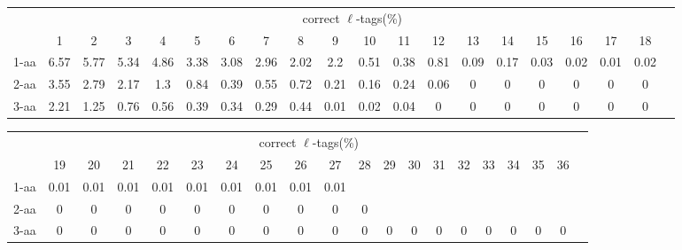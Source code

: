 \documentclass{article}[12pt]
\begin{document}
\begin{landscape}

\begin{table}[h]\tiny
\vspace{3mm}
{\centering
\begin{center}
\begin{tabular}{|l|c|c|c|c|c|c|c|c|c|c|c|c|c|c|c|c|c|c|c|}
  \hline
  & \multicolumn{ 18 }{|c|}{correct $\ell$-tags(\%)} \\
  \cline{2- 19}
    & 1 & 2 & 3 & 4 & 5 & 6 & 7 & 8 & 9 & 10 & 11 & 12 & 13 & 14 & 15 & 16 & 17 & 18\\
  \hline
1-aa  & 6.57 & 5.77 & 5.34 & 4.86 & 3.38 & 3.08 & 2.96 & 2.02 & 2.2 & 0.51 & 0.38 & 0.81 & 0.09 & 0.17 & 0.03 & 0.02 & 0.01 & 0.02\\
2-aa  & 3.55 & 2.79 & 2.17 & 1.3 & 0.84 & 0.39 & 0.55 & 0.72 & 0.21 & 0.16 & 0.24 & 0.06 & 0 & 0 & 0 & 0 & 0 & 0\\
3-aa  & 2.21 & 1.25 & 0.76 & 0.56 & 0.39 & 0.34 & 0.29 & 0.44 & 0.01 & 0.02 & 0.04 & 0 & 0 & 0 & 0 & 0 & 0 & 0\\
 \hline
\end{tabular}
\end{center}
\par}
\centering

\vspace{3mm}
\end{table}
\begin{table}[h]\tiny
\vspace{3mm}
{\centering
\begin{center}
\begin{tabular}{|l|c|c|c|c|c|c|c|c|c|c|c|c|c|c|c|c|c|c|c|}
  \hline
  & \multicolumn{ 18 }{|c|}{correct $\ell$-tags(\%)} \\
  \cline{2- 19}
    & 19 & 20 & 21 & 22 & 23 & 24 & 25 & 26 & 27 & 28 & 29 & 30 & 31 & 32 & 33 & 34 & 35 & 36\\
  \hline
1-aa  & 0.01 & 0.01 & 0.01 & 0.01 & 0.01 & 0.01 & 0.01 & 0.01 & 0.01 &  &  &  &  &  &  &  &  & \\
2-aa  & 0 & 0 & 0 & 0 & 0 & 0 & 0 & 0 & 0 & 0 &  &  &  &  &  &  &  & \\
3-aa  & 0 & 0 & 0 & 0 & 0 & 0 & 0 & 0 & 0 & 0 & 0 & 0 & 0 & 0 & 0 & 0 & 0 & 0\\
 \hline
\end{tabular}
\end{center}
\par}
\centering


\end{table}
\end{landscape}
\end{document}
